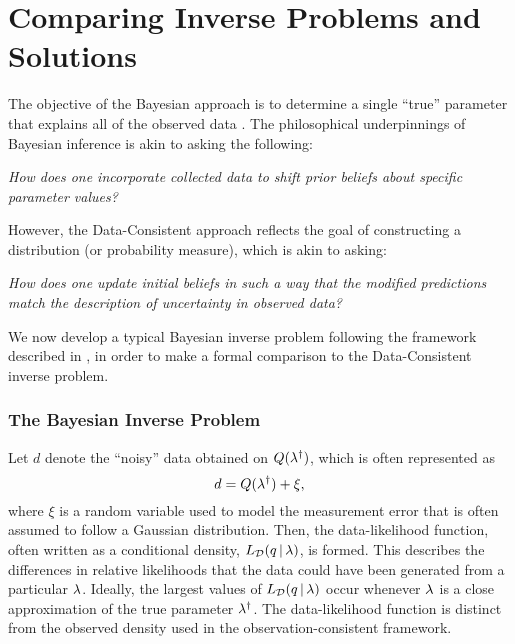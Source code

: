 \section{Comparing Inverse Problems and Solutions}\label{sec:compare}

The objective of the Bayesian approach is to determine a single ``true'' parameter that explains all of the observed data \citep{Smith, Concrete, Complete, Stuart10, Tarantola_book}.
The philosophical underpinnings of Bayesian inference is akin to asking the following:

\begin{center}
  \emph{How does one incorporate collected data to shift prior beliefs about specific parameter values?}
\end{center}

However, the Data-Consistent approach reflects the goal of constructing a distribution (or probability measure), which is akin to asking:

\begin{center}
  \emph{How does one update initial beliefs in such a way that the modified predictions match the description of uncertainty in observed data?}
\end{center}

We now develop a typical Bayesian inverse problem following the framework described in \cite{Stuart10, Smith}, in order to make a formal comparison to the Data-Consistent inverse problem.

\subsubsection{The Bayesian Inverse Problem}
Let $d$ denote the ``noisy'' data obtained on $Q(\lambda^\dagger)$, which is often represented as
\begin{equation*}
	d = Q(\lambda^\dagger) + \xi,
\end{equation*}
where $\xi$ is a random variable used to model the measurement error that is often assumed to follow a Gaussian distribution.
Then, the data-likelihood function, often written as a conditional density, $L_{\mathcal{D}}(q \, |\, \lambda)$, is formed.
This describes the differences in relative likelihoods that the data could have been generated from a particular $\lambda$.
Ideally, the largest values of $L_{\mathcal{D}}(q \, | \, \lambda)$ occur whenever $\lambda$ is a close approximation of the true parameter $\lambda^\dagger$.
The data-likelihood function is distinct from the observed density used in the observation-consistent framework.


